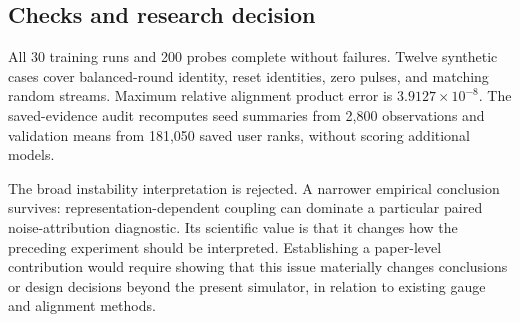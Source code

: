 \subsection{Checks and research decision}
All 30 training runs and 200 probes complete without failures. Twelve
synthetic cases cover balanced-round identity, reset identities, zero
pulses, and matching random streams. Maximum relative alignment product
error is $3.9127\times10^{-8}$. The saved-evidence audit recomputes seed
summaries from 2,800 observations and validation means from 181,050 saved
user ranks, without scoring additional models.

The broad instability interpretation is rejected. A narrower empirical
conclusion survives: representation-dependent coupling can dominate a
particular paired noise-attribution diagnostic. Its scientific value is
that it changes how the preceding experiment should be interpreted.
Establishing a paper-level contribution would require showing that this
issue materially changes conclusions or design decisions beyond the
present simulator, in relation to existing gauge and alignment methods.
\FloatBarrier
